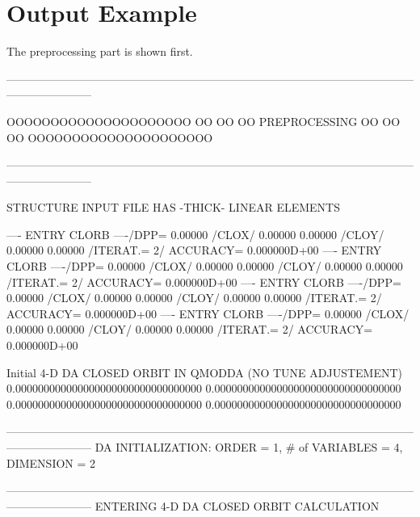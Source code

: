 
\clearpage

\section{Output Example} \label{output}

The preprocessing part is shown first.

\begin{ctverbatim}
-----------------------------------------------------------------------------------------------------------------------------------

    OOOOOOOOOOOOOOOOOOOOO
    OO                 OO
    OO  PREPROCESSING  OO
    OO                 OO
    OOOOOOOOOOOOOOOOOOOOO

-----------------------------------------------------------------------------------------------------------------------------------


    STRUCTURE INPUT FILE HAS -THICK- LINEAR ELEMENTS


---- ENTRY CLORB ----/DPP= 0.00000 /CLOX/   0.00000   0.00000 /CLOY/   0.00000   0.00000 /ITERAT.=  2/ ACCURACY= 0.000000D+00
---- ENTRY CLORB ----/DPP= 0.00000 /CLOX/   0.00000   0.00000 /CLOY/   0.00000   0.00000 /ITERAT.=  2/ ACCURACY= 0.000000D+00
---- ENTRY CLORB ----/DPP= 0.00000 /CLOX/   0.00000   0.00000 /CLOY/   0.00000   0.00000 /ITERAT.=  2/ ACCURACY= 0.000000D+00
---- ENTRY CLORB ----/DPP= 0.00000 /CLOX/   0.00000   0.00000 /CLOY/   0.00000   0.00000 /ITERAT.=  2/ ACCURACY= 0.000000D+00

    Initial 4-D DA CLOSED ORBIT IN QMODDA (NO TUNE ADJUSTEMENT)
        0.000000000000000000000000000000000
        0.000000000000000000000000000000000
        0.000000000000000000000000000000000
        0.000000000000000000000000000000000

-----------------------------------------------------------------------------------------------------------------------------------
     DA INITIALIZATION: ORDER =  1, # of VARIABLES =  4, DIMENSION =  2


-----------------------------------------------------------------------------------------------------------------------------------
    ENTERING 4-D DA CLOSED ORBIT CALCULATION


\end{ctverbatim}
